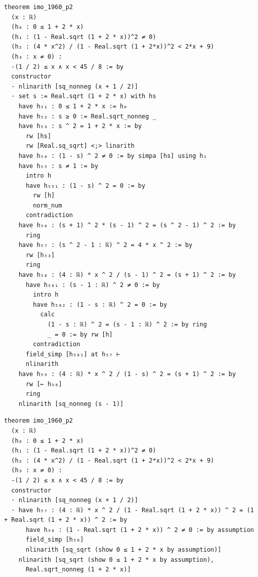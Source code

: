 \begin{tcolorbox}[colback=lightblue, boxrule=0pt, arc=5pt, outer arc=5pt, after skip=10pt plus 2pt]
\begin{minipage}[t]{0.99\textwidth}
\begin{lstlisting}[caption={Original Proof (Length 330)}, language=lean, breaklines=true, style=mystyle]
theorem imo_1960_p2
  (x : ℝ)
  (h₀ : 0 ≤ 1 + 2 * x)
  (h₁ : (1 - Real.sqrt (1 + 2 * x))^2 ≠ 0)
  (h₂ : (4 * x^2) / (1 - Real.sqrt (1 + 2*x))^2 < 2*x + 9)
  (h₃ : x ≠ 0) :
  -(1 / 2) ≤ x ∧ x < 45 / 8 := by
  constructor
  · nlinarith [sq_nonneg (x + 1 / 2)]
  · set s := Real.sqrt (1 + 2 * x) with hs
    have h₅₁ : 0 ≤ 1 + 2 * x := h₀
    have h₅₂ : s ≥ 0 := Real.sqrt_nonneg _
    have h₅₃ : s ^ 2 = 1 + 2 * x := by
      rw [hs]
      rw [Real.sq_sqrt] <;> linarith
    have h₅₄ : (1 - s) ^ 2 ≠ 0 := by simpa [hs] using h₁
    have h₅₅ : s ≠ 1 := by
      intro h
      have h₅₅₁ : (1 - s) ^ 2 = 0 := by
        rw [h]
        norm_num
      contradiction
    have h₅₆ : (s + 1) ^ 2 * (s - 1) ^ 2 = (s ^ 2 - 1) ^ 2 := by
      ring
    have h₅₇ : (s ^ 2 - 1 : ℝ) ^ 2 = 4 * x ^ 2 := by
      rw [h₅₃]
      ring
    have h₅₈ : (4 : ℝ) * x ^ 2 / (s - 1) ^ 2 = (s + 1) ^ 2 := by
      have h₅₈₁ : (s - 1 : ℝ) ^ 2 ≠ 0 := by
        intro h
        have h₅₈₂ : (1 - s : ℝ) ^ 2 = 0 := by
          calc
            (1 - s : ℝ) ^ 2 = (s - 1 : ℝ) ^ 2 := by ring
            _ = 0 := by rw [h]
        contradiction
      field_simp [h₅₈₁] at h₅₇ ⊢
      nlinarith
    have h₅₉ : (4 : ℝ) * x ^ 2 / (1 - s) ^ 2 = (s + 1) ^ 2 := by
      rw [← h₅₈]
      ring
    nlinarith [sq_nonneg (s - 1)]
\end{lstlisting}
\end{minipage}
\begin{minipage}[t]{0.99\textwidth}
\begin{lstlisting}[caption={Simplified Proof (Length 125)}, language=lean, breaklines=true, style=mystyle]
theorem imo_1960_p2
  (x : ℝ)
  (h₀ : 0 ≤ 1 + 2 * x)
  (h₁ : (1 - Real.sqrt (1 + 2 * x))^2 ≠ 0)
  (h₂ : (4 * x^2) / (1 - Real.sqrt (1 + 2*x))^2 < 2*x + 9)
  (h₃ : x ≠ 0) :
  -(1 / 2) ≤ x ∧ x < 45 / 8 := by
  constructor
  · nlinarith [sq_nonneg (x + 1 / 2)]
  · have h₅₇ : (4 : ℝ) * x ^ 2 / (1 - Real.sqrt (1 + 2 * x)) ^ 2 = (1 + Real.sqrt (1 + 2 * x)) ^ 2 := by
      have h₅₈ : (1 - Real.sqrt (1 + 2 * x)) ^ 2 ≠ 0 := by assumption
      field_simp [h₅₈]
      nlinarith [sq_sqrt (show 0 ≤ 1 + 2 * x by assumption)]
    nlinarith [sq_sqrt (show 0 ≤ 1 + 2 * x by assumption),
      Real.sqrt_nonneg (1 + 2 * x)]
\end{lstlisting}
\end{minipage}
\end{tcolorbox}

